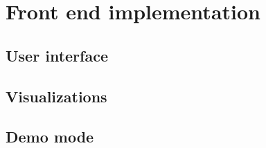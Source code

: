 \section{Front end implementation}
\subsection{User interface}
\subsection{Visualizations}
\subsection{Demo mode}